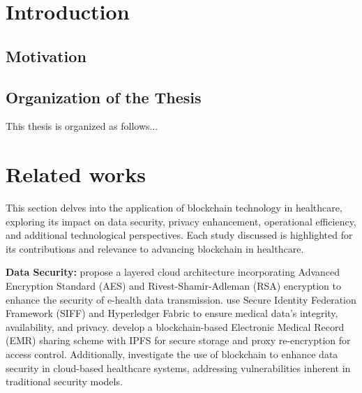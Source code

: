 \documentclass[cic,tc,english]{iiufrgs}
\begin{document}
\tableofcontents

\chapter{Introduction}

\section{Motivation}
    

\section{Organization of the Thesis}
This thesis is organized as follows...


\chapter{Related works}
    This section delves into the application of blockchain technology in healthcare, exploring its impact on data security, privacy enhancement, operational efficiency, and additional technological perspectives. Each study discussed is highlighted for its contributions and relevance to advancing blockchain in healthcare.



    \textbf{Data Security:} \citet{Memos2021} propose a layered cloud architecture incorporating Advanced Encryption Standard (AES) and Rivest-Shamir-Adleman (RSA) encryption to enhance the security of e-health data transmission. \citet{Tian2019} use Secure Identity Federation Framework (SIFF) and Hyperledger Fabric to ensure medical data's integrity, availability, and privacy. \citet{Liu2024} develop a blockchain-based Electronic Medical Record (EMR) sharing scheme with IPFS for secure storage and proxy re-encryption for access control. Additionally, \citet{Esposito2018} investigate the use of blockchain to enhance data security in cloud-based healthcare systems, addressing vulnerabilities inherent in traditional security models.
    
\end{document}
